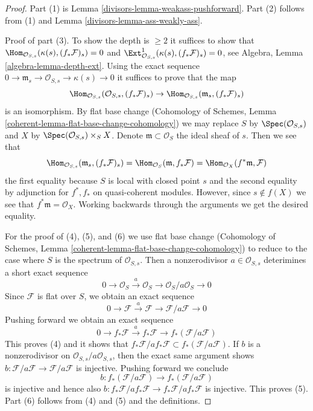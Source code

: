 \begin{proof}

Part (1) is Lemma \ref{divisors-lemma-weakass-pushforward}.
Part (2) follows from (1) and Lemma \ref{divisors-lemma-ass-weakly-ass}.

\medskip\noindent
Proof of part (3). To show the depth is $\geq 2$ it suffices to show that
$\Hom_{\mathcal{O}_{S, s}}(\kappa(s), (f_*\mathcal{F})_s) = 0$ and
$\Ext^1_{\mathcal{O}_{S, s}}(\kappa(s), (f_*\mathcal{F})_s) = 0$, see
Algebra, Lemma \ref{algebra-lemma-depth-ext}.
Using the exact sequence
$0 \to \mathfrak m_s \to \mathcal{O}_{S, s} \to \kappa(s) \to 0$
it suffices to prove that the map
$$
\Hom_{\mathcal{O}_{S, s}}(\mathcal{O}_{S, s}, (f_*\mathcal{F})_s)
\to
\Hom_{\mathcal{O}_{S, s}}(\mathfrak m_s, (f_*\mathcal{F})_s)
$$
is an isomorphism. By flat base change (Cohomology of Schemes, Lemma
\ref{coherent-lemma-flat-base-change-cohomology})
we may replace $S$ by
$\Spec(\mathcal{O}_{S, s})$ and $X$ by $\Spec(\mathcal{O}_{S, s}) \times_S X$.
Denote $\mathfrak m \subset \mathcal{O}_S$ the ideal sheaf of $s$.
Then we see that
$$
\Hom_{\mathcal{O}_{S, s}}(\mathfrak m_s, (f_*\mathcal{F})_s) =
\Hom_{\mathcal{O}_S}(\mathfrak m, f_*\mathcal{F}) =
\Hom_{\mathcal{O}_X}(f^*\mathfrak m, \mathcal{F})
$$
the first equality because $S$ is local with closed point $s$
and the second equality
by adjunction for $f^*, f_*$ on quasi-coherent modules. However, since
$s \not \in f(X)$ we see that $f^*\mathfrak m = \mathcal{O}_X$.
Working backwards through the arguments we get the desired equality.

\medskip\noindent
For the proof of (4), (5), and (6) we use flat base change
(Cohomology of Schemes, Lemma
\ref{coherent-lemma-flat-base-change-cohomology})
to reduce to the case where $S$ is the spectrum of
$\mathcal{O}_{S, s}$.
Then a nonzerodivisor $a \in \mathcal{O}_{S, s}$
deterimines a short exact sequence
$$
0 \to \mathcal{O}_S \xrightarrow{a} \mathcal{O}_S \to
\mathcal{O}_S/a \mathcal{O}_S \to 0
$$
Since $\mathcal{F}$ is flat over $S$, we obtain an exact sequence
$$
0 \to \mathcal{F} \xrightarrow{a} \mathcal{F} \to
\mathcal{F}/a\mathcal{F} \to 0
$$
Pushing forward we obtain an exact sequence
$$
0 \to f_*\mathcal{F} \xrightarrow{a} f_*\mathcal{F} \to
f_*(\mathcal{F}/a\mathcal{F})
$$
This proves (4) and it shows that
$f_*\mathcal{F}/ af_*\mathcal{F} \subset f_*(\mathcal{F}/a\mathcal{F})$.
If $b$ is a nonzerodivisor on
$\mathcal{O}_{S, s}/a\mathcal{O}_{S, s}$, then the exact same argument shows
$b : \mathcal{F}/a\mathcal{F} \to \mathcal{F}/a\mathcal{F}$
is injective. Pushing forward we conclude
$$
b : f_*(\mathcal{F}/a\mathcal{F}) \to f_*(\mathcal{F}/a\mathcal{F})
$$
is injective and hence also
$b : f_*\mathcal{F}/ af_*\mathcal{F} \to f_*\mathcal{F}/ af_*\mathcal{F}$
is injective. This proves (5). Part (6) follows from
(4) and (5) and the definitions.
\end{proof}

